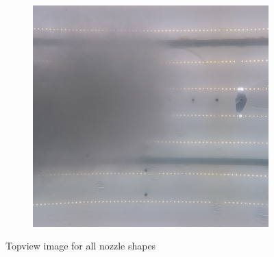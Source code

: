\begin{figure}[ht!]
\begin{subfigure}{.24\textwidth}
  \includegraphics[width=.9\linewidth]{Images/Snapshot_Rechthoek_30x26.png}
\end{subfigure}
\caption{Topview image for all nozzle shapes}
\label{fig:topview}
\end{figure}

